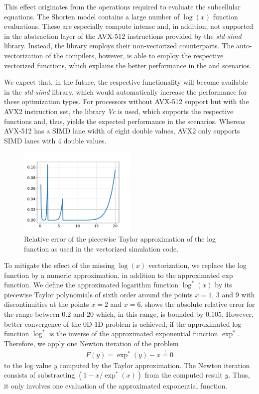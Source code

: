 This effect originates from the operations required to evaluate the subcellular equations. The Shorten model contains a large number of $\log(x)$ function evaluations. These are especially compute intense and, in addition, not supported in the abstraction layer of the AVX-512 instructions provided by the \emph{std-simd} library. Instead, the library employs their non-vectorized counterparts. The auto-vectorization of the compilers, however, is able to employ the respective vectorized functions, which explains the better performance in the  and  scenarios. 

We expect that, in the future, the respective functionality will become available in the \emph{std-simd} library, which would automatically increase the performance for these optimization types. For processors without AVX-512 support but with the AVX2 instruction set, the library \emph{Vc} is used, which supports the respective functions and, thus, yields the expected performance in the  scenarios. Whereas AVX-512 has a SIMD lane width of eight double values, AVX2 only supports SIMD lanes with 4 double values.

\begin{figure}
  \centering%
  \includegraphics[width=0.5\textwidth]{images/results/studies/apxlog.pdf}%
  \caption{Relative error of the piecewise Taylor approximation of the log function as used in the vectorized simulation code.}%
  \label{fig:apxlog}%
\end{figure}%
To mitigate the effect of the missing $\log(x)$ vectorization, we replace the log function by a numeric approximation, in addition to the approximated exp function. We define the approximated logarithm function $\log^\ast(x)$ by its piecewise Taylor polynomials of sixth order around the points $x=1$, 3 and 9 with discontinuities at the points $x=2$ and $x=6$.  shows the absolute relative error for the range between $0.2$ and 20 which, in this range, is bounded by $0.105$. However, better convergence of the 0D-1D problem is achieved, if the approximated log function $\log^\ast$ is the inverse of the approximated exponential function $\exp^\ast$. Therefore, we apply one Newton iteration of the problem %
\begin{align*}
  F(y) = \exp^\ast(y)-x \overset{!}{=} 0  
\end{align*}
%
to the log value $y$ computed by the Taylor approximation. The Newton iteration consists of substracting ${(1 - x/\exp^\ast(x))}$ from the computed result $y$. Thus, it only involves one evaluation of the approximated exponential function.


